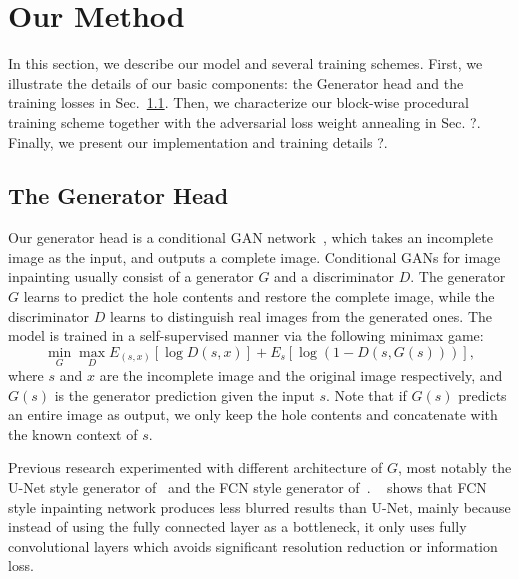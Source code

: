 \documentclass[runningheads]{llncs}
\begin{document}
\section{Our Method}

In this section, we describe our model and several training schemes. First, we illustrate the details of our basic components: the Generator head and the training losses in Sec.~\ref{sec:resnet_head}. Then, we characterize our block-wise procedural training scheme together with the adversarial loss weight annealing in Sec. ?. Finally, we present our implementation and training details ?. 

\subsection{The Generator Head}
\label{sec:resnet_head}

Our generator head is a conditional GAN network~\cite{mirza2014conditional}, which takes an incomplete image as the input, and outputs a complete image. Conditional GANs for image inpainting usually consist of a generator $G$ and a discriminator $D$. The generator $G$ learns to predict the hole contents and restore the complete image, while the discriminator $D$ learns to distinguish real images from the generated ones. The model is trained in a self-supervised manner via the following minimax game:
\[
\min\limits_G \max\limits_D E_{(s,x)}[\log D(s,x)] + E_s[\log (1-D(s,G(s)))],
\]
where $s$ and $x$ are the incomplete image and the original image respectively, and $G(s)$ is the generator prediction given the input $s$. Note that if $G(s)$ predicts an entire image as output, we only keep the hole contents and concatenate with the known context of $s$.

Previous research experimented with different architecture of $G$, most notably the U-Net style generator of~\cite{pathak2016context} and the FCN style generator of~\cite{iizuka2017globally}. ~\cite{iizuka2017globally} shows that FCN style inpainting network produces less blurred results than U-Net, mainly because instead of using the fully connected layer as a bottleneck, it only uses fully convolutional layers which avoids significant resolution reduction or information loss.
\end{document}

